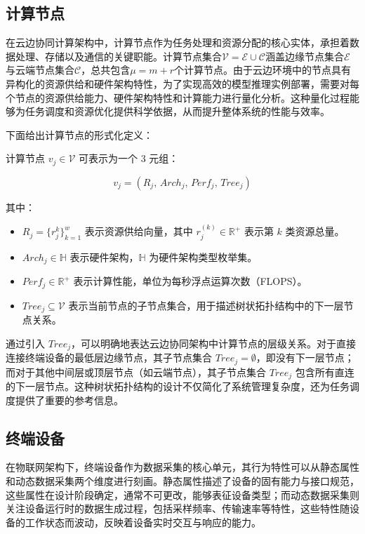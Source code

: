 \subsection{计算节点}

在云边协同计算架构中，计算节点作为任务处理和资源分配的核心实体，承担着数据处理、存储以及通信的关键职能。计算节点集合$\mathcal{V} = \mathcal{E} \cup \mathcal{C}$涵盖边缘节点集合$\mathcal{E}$与云端节点集合$\mathcal{C}$，总共包含$\mu=m+r$个计算节点。由于云边环境中的节点具有异构化的资源供给和硬件架构特性，为了实现高效的模型推理实例部署，需要对每个节点的资源供给能力、硬件架构特性和计算能力进行量化分析。这种量化过程能够为任务调度和资源优化提供科学依据，从而提升整体系统的性能与效率。

下面给出计算节点的形式化定义：

\begin{definition}[计算节点]
\label{def:node}
计算节点 $v_j \in \mathcal{V}$ 可表示为一个 3 元组：
\end{definition}

$$
v_j = (R_j,\, Arch_j,\, Perf_j ,\, Tree_j)
$$

其中：
\begin{itemize}
    \item $R_j = \{r^{k}_j\}_{k=1}^w$ 表示资源供给向量，其中 $r^{(k)}_j \in \mathbb{R}^+$ 表示第 $k$ 类资源总量。
    \item $Arch_j \in \mathbb{H}$ 表示硬件架构，$\mathbb{H}$ 为硬件架构类型枚举集。
    \item $Perf_j \in \mathbb{R}^+$ 表示计算性能，单位为每秒浮点运算次数（FLOPS）。
    \item $Tree_j \subseteq \mathcal{V}$ 表示当前节点的子节点集合，用于描述树状拓扑结构中的下一层节点关系。
\end{itemize}

通过引入 $Tree_j$，可以明确地表达云边协同架构中计算节点的层级关系。对于直接连接终端设备的最低层边缘节点，其子节点集合 $Tree_j = \emptyset$，即没有下一层节点；而对于其他中间层或顶层节点（如云端节点），其子节点集合 $Tree_j$ 包含所有直连的下一层节点。这种树状拓扑结构的设计不仅简化了系统管理复杂度，还为任务调度提供了重要的参考信息。

\subsection{终端设备}

在物联网架构下，终端设备作为数据采集的核心单元，其行为特性可以从静态属性和动态数据采集两个维度进行刻画。静态属性描述了设备的固有能力与接口规范，这些属性在设计阶段确定，通常不可更改，能够表征设备类型；而动态数据采集则关注设备运行时的数据生成过程，包括采样频率、传输速率等特性，这些特性随设备的工作状态而波动，反映着设备实时交互与响应的能力。

